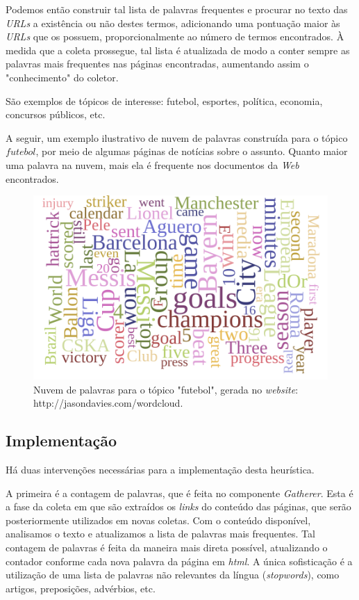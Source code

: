\documentclass[a4paper,12pt,titlepage]{article}
\begin{document}
Podemos então construir tal lista de palavras frequentes e procurar no texto das \textit{URLs} a existência ou não destes termos, adicionando uma pontuação maior às \textit{URLs} que os possuem, proporcionalmente ao número de termos encontrados. À medida que a coleta prossegue, tal lista é atualizada de modo a conter sempre as palavras mais frequentes nas páginas encontradas, aumentando assim o "conhecimento" do coletor.

São exemplos de tópicos de interesse: futebol, esportes, política, economia, concursos públicos, etc.

A seguir, um exemplo ilustrativo de nuvem de palavras construída para o tópico $futebol$, por meio de algumas páginas de notícias sobre o assunto. Quanto maior uma palavra na nuvem, mais ela é frequente nos documentos da \textit{Web} encontrados. \\

\begin{figure}[H]
     \centering
     \includegraphics[scale=0.35]{figures/football-cloud.png}
     \caption{Nuvem de palavras para o tópico "futebol", gerada no \textit{website}: http://jasondavies.com/wordcloud.}
     \label{bsp}
\end{figure}

\subsection{Implementação}

Há duas intervenções necessárias para a implementação desta heurística. 

A primeira é a contagem de palavras, que é feita no componente \textit{Gatherer}. Esta é a fase da coleta em que são extraídos os \textit{links} do conteúdo das páginas, que serão posteriormente utilizados em novas coletas. Com o conteúdo disponível, analisamos o texto e atualizamos a lista de palavras mais frequentes. Tal contagem de palavras é feita da maneira mais direta possível, atualizando o contador conforme cada nova palavra da página em \textit{html}. A única sofisticação é a utilização de uma lista de palavras não relevantes da língua (\textit{stopwords}), como artigos, preposições, advérbios, etc.
\end{document}
